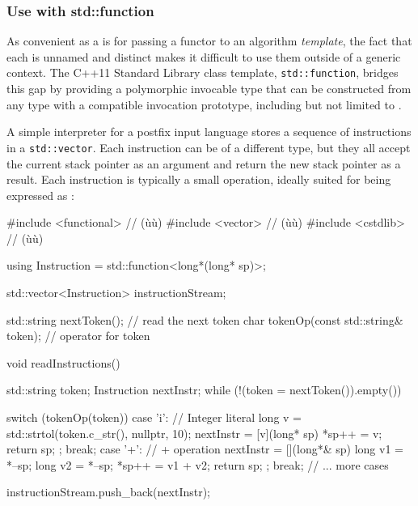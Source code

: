 \subsubsection[Use with \lstinline!std::function!]{Use with {\SubsubsecCode std::function}}\label{use-with-std::function}

As convenient as a  is for passing a functor
to an algorithm \emph{template}, the fact that each  is unnamed and distinct makes it difficult to use them outside of
a generic context. The C++11 Standard Library class template,
\lstinline!std::function!, bridges this gap by providing a polymorphic
invocable type that can be constructed from any type with a compatible
invocation prototype, including but not limited to .

A simple interpreter for a postfix input language stores a sequence of
instructions in a \lstinline!std::vector!. Each instruction can be of a
different type, but they all accept the current stack pointer as an
argument and return the new stack pointer as a result. Each instruction
is typically a small operation, ideally suited for being expressed as
:

\begin{emcppslisting}
#include <functional>  // (ù{}ù)
#include <vector>      // (ù{}ù)
#include <cstdlib>     // (ù{}ù)

using Instruction = std::function<long*(long* sp)>;

std::vector<Instruction> instructionStream;

std::string nextToken();                 // read the next token
char tokenOp(const std::string& token);  // operator for token

void readInstructions()
{
    std::string token;
    Instruction nextInstr;
    while (!(token = nextToken()).empty())
    {
        switch (tokenOp(token))
        {
            case 'i':
            {
                // Integer literal
                long v = std::strtol(token.c_str(), nullptr, 10);
                nextInstr = [v](long* sp){ *sp++ = v; return sp; };
                break;
            }
            case '+':
            {
                // + operation
                nextInstr = [](long*& sp){
                    long v1 = *--sp;
                    long v2 = *--sp;
                    *sp++ = v1 + v2;
                    return sp;
                };
                break;
            }
            // ... more cases
        }

        instructionStream.push_back(nextInstr);
    }
}
\end{emcppslisting}
    

